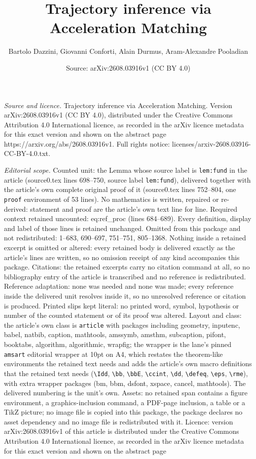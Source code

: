 \documentclass[10pt,a4paper]{amsart}
\title[Trajectory inference via Acceleration Matching]{Trajectory inference via Acceleration Matching}
\author{Bartolo Dazzini, Giovanni Conforti, Alain Durmus, Aram-Alexandre Pooladian}
\date{Source: arXiv:2608.03916v1 (CC BY 4.0)}
\begin{document}
\maketitle

\noindent\emph{Source and licence.} Trajectory inference via Acceleration Matching. Version arXiv:2608.03916v1 (CC BY 4.0), distributed under the Creative Commons Attribution 4.0 International licence, as recorded in the arXiv licence metadata for this exact version and shown on the abstract page https://arxiv.org/abs/2608.03916v1. Full rights notice: licenses/arxiv-2608.03916-CC-BY-4.0.txt.\par\smallskip

\noindent\textit{Editorial scope.} Counted unit: the Lemma whose source label is \texttt{lem:fund} in the article (source0.tex lines 698--750, source label \texttt{lem:fund}), delivered together with the article's own complete original proof of it (source0.tex lines 752--804, one \texttt{proof} environment of 53 lines). No mathematics is written, repaired or re-derived: statement and proof are the article's own text line for line. Required context retained uncounted: eq:ref\_proc (lines 684--689). Every definition, display and label of those lines is retained unchanged. Omitted from this package and not redistributed: 1--683, 690--697, 751--751, 805--1368. Nothing inside a retained excerpt is omitted or altered: every retained body is delivered exactly as the article's lines are written, so no omission receipt of any kind accompanies this package. Citations: the retained excerpts carry no citation command at all, so no bibliography entry of the article is transcribed and no reference is redistributed. Reference adaptation: none was needed and none was made; every reference inside the delivered unit resolves inside it, so no unresolved reference or citation is produced. Printed slips kept literal: no printed word, symbol, hypothesis or number of the counted statement or of its proof was altered. Layout and class: the article's own class is \texttt{article} with packages including geometry, inputenc, babel, natbib, caption, mathtools, amssymb, amsthm, subcaption, pifont, booktabs, algorithm, algorithmic, wrapfig; the wrapper is the lane's pinned \texttt{amsart} editorial wrapper at 10pt on A4, which restates the theorem-like environments the retained text needs and adds the article's own macro definitions that the retained text needs (\texttt{\textbackslash Idd}, \texttt{\textbackslash bb}, \texttt{\textbackslash bbE}, \texttt{\textbackslash ccint}, \texttt{\textbackslash dd}, \texttt{\textbackslash defeq}, \texttt{\textbackslash eps}, \texttt{\textbackslash rme}), with extra wrapper packages (bm, bbm, dsfont, xspace, cancel, mathtools). The delivered numbering is the unit's own. Assets: no retained span contains a figure environment, a graphics-inclusion command, a PDF-page inclusion, a table or a TikZ picture; no image file is copied into this package, the package declares no asset dependency and no image file is redistributed with it. Licence: version arXiv:2608.03916v1 of this article is distributed under the Creative Commons Attribution 4.0 International licence, as recorded in the arXiv licence metadata for this exact version and shown on the abstract page 
\end{document}
